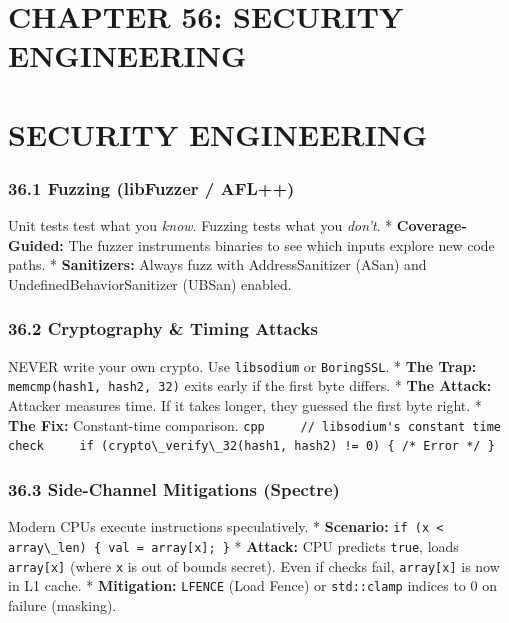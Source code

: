 \hypertarget{chapter-56-security-engineering}{%
\section{CHAPTER 56: SECURITY
ENGINEERING}\label{chapter-56-security-engineering}}

\hypertarget{security-engineering}{%
\section{SECURITY ENGINEERING}\label{security-engineering}}

\hypertarget{fuzzing-libfuzzer-afl}{%
\subsubsection{36.1 Fuzzing (libFuzzer /
AFL++)}\label{fuzzing-libfuzzer-afl}}

Unit tests test what you \emph{know}. Fuzzing tests what you
\emph{don't}. * \textbf{Coverage-Guided:} The fuzzer instruments
binaries to see which inputs explore new code paths. *
\textbf{Sanitizers:} Always fuzz with AddressSanitizer (ASan) and
UndefinedBehaviorSanitizer (UBSan) enabled.

\hypertarget{cryptography-timing-attacks}{%
\subsubsection{36.2 Cryptography \& Timing
Attacks}\label{cryptography-timing-attacks}}

NEVER write your own crypto. Use \passthrough{\lstinline!libsodium!} or
\passthrough{\lstinline!BoringSSL!}. * \textbf{The Trap:}
\passthrough{\lstinline!memcmp(hash1, hash2, 32)!} exits early if the
first byte differs. * \textbf{The Attack:} Attacker measures time. If it
takes longer, they guessed the first byte right. * \textbf{The Fix:}
Constant-time comparison.
\passthrough{\lstinline"cpp     // libsodium's constant time check     if (crypto\_verify\_32(hash1, hash2) != 0) \{ /* Error */ \}"}

\hypertarget{side-channel-mitigations-spectre}{%
\subsubsection{36.3 Side-Channel Mitigations
(Spectre)}\label{side-channel-mitigations-spectre}}

Modern CPUs execute instructions speculatively. * \textbf{Scenario:}
\passthrough{\lstinline!if (x < array\_len) \{ val = array[x]; \}!} *
\textbf{Attack:} CPU predicts \passthrough{\lstinline!true!}, loads
\passthrough{\lstinline!array[x]!} (where \passthrough{\lstinline!x!} is
out of bounds secret). Even if checks fail,
\passthrough{\lstinline!array[x]!} is now in L1 cache. *
\textbf{Mitigation:} \passthrough{\lstinline!LFENCE!} (Load Fence) or
\passthrough{\lstinline!std::clamp!} indices to 0 on failure (masking).
